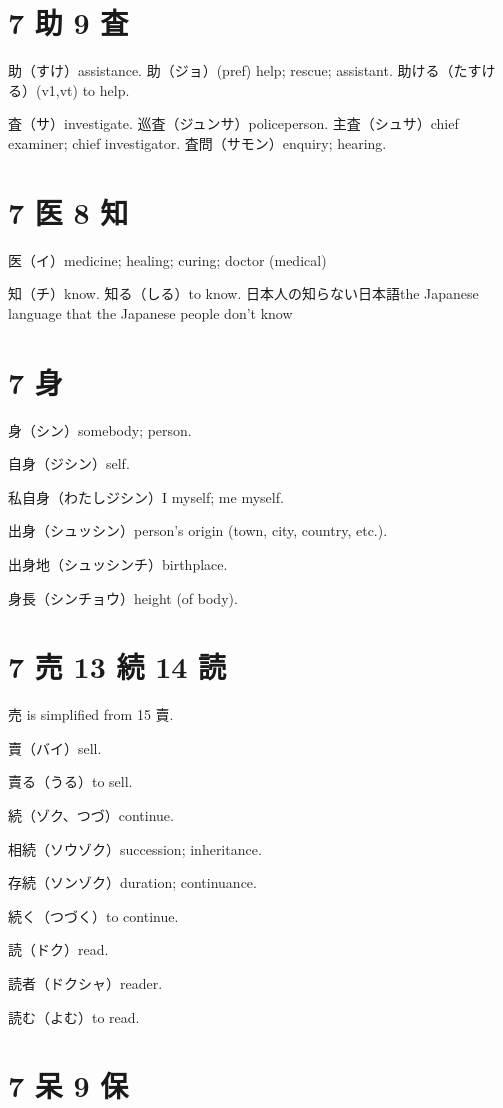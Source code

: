 \section{7 助 9 査}

助（すけ）assistance.
助（ジョ）(pref) help; rescue; assistant.
助ける（たすける）(v1,vt) to help.

査（サ）investigate.
巡査（ジュンサ）policeperson.
主査（シュサ）chief examiner; chief investigator.
査問（サモン）enquiry; hearing.

\section{7 医 8 知}

医（イ）medicine; healing; curing; doctor (medical)

知（チ）know.
知る（しる）to know.
日本人の知らない日本語the Japanese language that the Japanese people don't know

\section{7 身}

身（シン）somebody; person.

自身（ジシン）self.

私自身（わたしジシン）I myself; me myself.

出身（シュッシン）person's origin (town, city, country, etc.).

出身地（シュッシンチ）birthplace.

身長（シンチョウ）height (of body).

\section{7 売 13 続 14 読}

売 is simplified from 15 賣.

賣（バイ）sell.

賣る（うる）to sell.

続（ゾク、つづ）continue.

相続（ソウゾク）succession; inheritance.

存続（ソンゾク）duration; continuance.

続く（つづく）to continue.

読（ドク）read.

読者（ドクシャ）reader.

読む（よむ）to read.

\section{7 呆 9 保}

